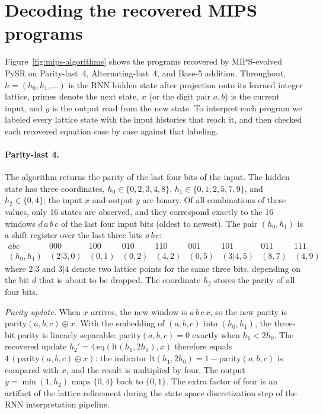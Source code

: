 \documentclass[10pt]{article}
\newcommand{\op}[1]{\mathrm{#1}}
\begin{document}
\section{Decoding the recovered MIPS programs}\label{app:mips-algorithms}

Figure~\ref{fig:mips-algorithms} shows the programs recovered by MIPS-evolved PySR on
Parity-last~4, Alternating-last~4, and Base-5 addition. Throughout, $h=(h_0,h_1,\ldots)$ is
the RNN hidden state after projection onto its learned integer lattice, primes denote the
next state, $x$ (or the digit pair $a,b$) is the current input, and $y$ is the output read
from the new state. To interpret each program we labeled every lattice state with the input
histories that reach it, and then checked each recovered equation case by case against that
labeling.

\paragraph{Parity-last 4.} The algorithm returns the parity of the last four bits of the input.
The hidden state has three coordinates, $h_0\in\{0,2,3,4,8\}$, $h_1\in\{0,1,2,5,7,9\}$, and
$h_2\in\{0,4\}$; the input $x$ and output $y$ are binary. Of all combinations of these values,
only 16 states are observed, and they correspond exactly to the 16 windows $d\,a\,b\,c$ of the
last four input bits (oldest to newest). The pair $(h_0,h_1)$ is a shift register over the
last three bits $a\,b\,c$:
\[
\begin{array}{c|cccccccc}
abc & 000 & 100 & 010 & 110 & 001 & 101 & 011 & 111\\\hline
(h_0,h_1) & (2|3,0) & (0,1) & (0,2) & (4,2) & (0,5) & (3|4,5) & (8,7) & (4,9)
\end{array}
\]
where $2|3$ and $3|4$ denote two lattice points for the same three bits, depending on the bit
$d$ that is about to be dropped. The coordinate $h_2$ stores the parity of all four bits.

\emph{Parity update.} When $x$ arrives, the new window is $a\,b\,c\,x$, so the new parity is
$\op{parity}(a,b,c)\oplus x$. With the embedding of $(a, b, c)$ into $(h_0, h_1)$, the three-bit parity is linearly separable:
$\op{parity}(a,b,c)=0$ exactly when $h_1<2h_0$. The recovered update
$h_2'=4\,\op{eq}(\op{lt}(h_1,2h_0),x)$ therefore equals $4\,(\op{parity}(a,b,c)\oplus x)$: the
indicator $\op{lt}(h_1,2h_0)=1-\op{parity}(a,b,c)$ is compared with $x$, and the result is
multiplied by four. The output $y=\min(1,h_2)$ maps $\{0,4\}$ back to $\{0,1\}$. The extra factor of four is an artifact of the lattice refinement during the state space discretization step of the RNN interpretation pipeline.
\end{document}
